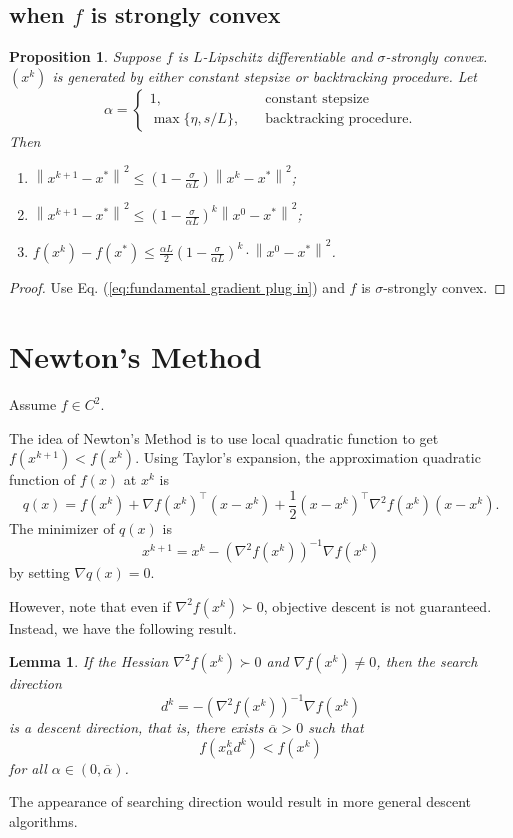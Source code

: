 \documentclass[12pt,a4paper]{report}
\numberwithin{equation}{section}
\theoremstyle{mystyle}
\newtheorem{lemma}[definition]{Lemma}
\newtheorem{proposition}[definition]{Proposition}
\newcommand{\grad}{\nabla}
\newcommand{\T}{\top}
\newcommand{\norm}[1]{\left\lVert #1 \right\rVert}
\begin{document}
	\subsection{when $f$ is strongly convex}
	\begin{proposition}
		Suppose $f$ is $L$-Lipschitz differentiable and $\sigma$-strongly convex. $(x^k)$ is generated by either constant stepsize or backtracking procedure. Let
		$$
		\alpha=
		\begin{cases}
			1, & \quad \text{constant stepsize}\\
			\max\{\eta,s/L\}, &\quad \text{backtracking procedure}.
		\end{cases}
		$$
		Then
		\begin{enumerate}
			\item $\norm{x^{k+1}-x^*}^2\leq (1-\frac{\sigma}{\alpha L})\norm{x^k-x^*}^2$;
			\item $\norm{x^{k+1}-x^*}^2\leq(1-\frac{\sigma}{\alpha L})^k\norm{x^0-x^*}^2$;
			\item $f(x^k)-f(x^*)\leq \frac{\alpha L}{2}(1-\frac{\sigma}{\alpha L})^{k}\cdot \norm{x^0-x^*}^2$.
		\end{enumerate}
	\end{proposition}
	\begin{proof}
		Use Eq. (\ref{eq:fundamental gradient plug in}) and $f$ is $\sigma$-strongly convex.
	\end{proof}
	
	
	\section{Newton's Method}
	Assume $f\in C^2$.
	
	The idea of Newton's Method is to use local quadratic function to get $f(x^{k+1})<f(x^k)$. Using Taylor's expansion, the approximation quadratic function of $f(x)$ at $x^k$ is
	$$
	q(x)=f(x^k)+\grad f(x^k)^\T (x-x^k)+\frac{1}{2} (x-x^k)^\T \grad^2 f(x^k)(x-x^k).
	$$
	The minimizer of $q(x)$ is
	$$
	x^{k+1} = x^k- (\grad^2 f(x^k))^{-1} \grad f(x^k)
	$$
	by setting $\grad q(x)=0$.
	
	However, note that even if $\grad^2 f(x^k)\succ 0$, objective descent is not guaranteed. Instead, we have the following result.
	\begin{lemma}
		If the Hessian $\grad^2 f(x^k)\succ 0$ and $\grad f(x^k)\neq 0$, then the search direction
		$$
		d^k=-(\grad^2 f(x^k))^{-1}\grad f(x^k)
		$$
		is a descent direction, that is, there exists $\overline{\alpha}>0$ such that
		$$
		f(x^{k}_\alpha d^k)<f(x^k)
		$$
		for all $\alpha\in (0,\overline{\alpha})$.
	\end{lemma}
	The appearance of searching direction would result in more general descent algorithms.
	
\end{document}
